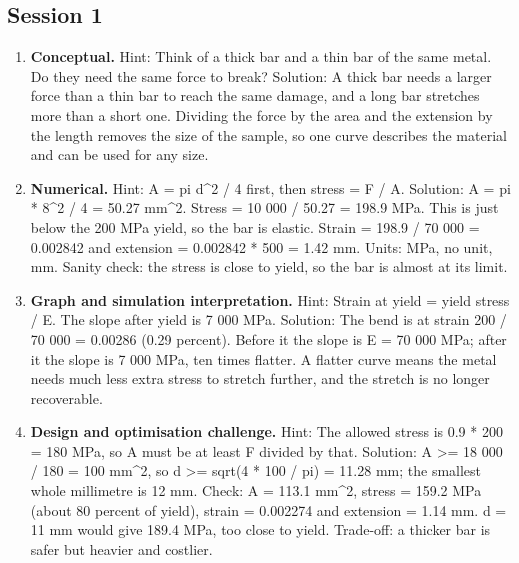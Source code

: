 \documentclass[11pt,a4paper]{article}
\begin{document}
\subsection*{Session 1}
\begin{enumerate}[nosep]
\item \textbf{Conceptual.} Hint: Think of a thick bar and a thin bar of the same metal. Do they need the same force to break? Solution: A thick bar needs a larger force than a thin bar to reach the same damage, and a long bar stretches more than a short one. Dividing the force by the area and the extension by the length removes the size of the sample, so one curve describes the material and can be used for any size.
\item \textbf{Numerical.} Hint: A = pi d\textasciicircum{}2 / 4 first, then stress = F / A. Solution: A = pi * 8\textasciicircum{}2 / 4 = 50.27 mm\textasciicircum{}2. Stress = 10 000 / 50.27 = 198.9 MPa. This is just below the 200 MPa yield, so the bar is elastic. Strain = 198.9 / 70 000 = 0.002842 and extension = 0.002842 * 500 = 1.42 mm. Units: MPa, no unit, mm. Sanity check: the stress is close to yield, so the bar is almost at its limit.
\item \textbf{Graph and simulation interpretation.} Hint: Strain at yield = yield stress / E. The slope after yield is 7 000 MPa. Solution: The bend is at strain 200 / 70 000 = 0.00286 (0.29 percent). Before it the slope is E = 70 000 MPa; after it the slope is 7 000 MPa, ten times flatter. A flatter curve means the metal needs much less extra stress to stretch further, and the stretch is no longer recoverable.
\item \textbf{Design and optimisation challenge.} Hint: The allowed stress is 0.9 * 200 = 180 MPa, so A must be at least F divided by that. Solution: A \textgreater{}= 18 000 / 180 = 100 mm\textasciicircum{}2, so d \textgreater{}= sqrt(4 * 100 / pi) = 11.28 mm; the smallest whole millimetre is 12 mm. Check: A = 113.1 mm\textasciicircum{}2, stress = 159.2 MPa (about 80 percent of yield), strain = 0.002274 and extension = 1.14 mm. d = 11 mm would give 189.4 MPa, too close to yield. Trade-off: a thicker bar is safer but heavier and costlier.
\end{enumerate}
\end{document}
